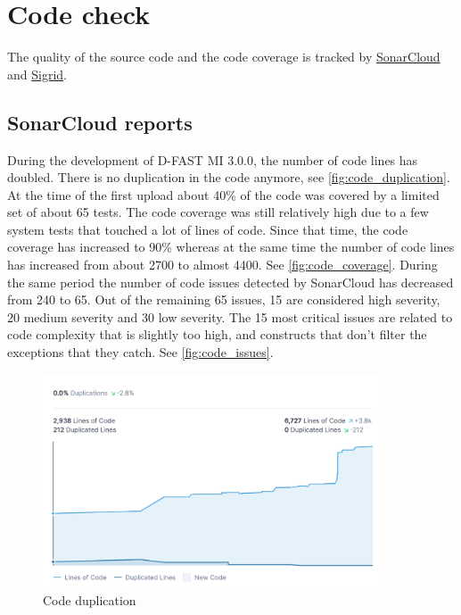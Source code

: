 \section{Code check}
The quality of the \dfastmi source code and the code coverage is tracked by \href{https://sonarcloud.io/project/overview?id=Deltares_D-FAST_Morphological_Impact}{SonarCloud} and \href{https://sigrid-says.com/deltares/dfast-mi/-/overview}{Sigrid}.

\subsection{SonarCloud reports}
During the development of D-FAST MI 3.0.0, the number of code lines has doubled.
There is no duplication in the code anymore, see \autoref{fig:code_duplication}.
At the time of the first upload about 40\% of the code was covered by a limited set of about 65 tests.
The code coverage was still relatively high due to a few system tests that touched a lot of lines of code.
Since that time, the code coverage has increased to 90\% whereas at the same time the number of code lines has increased from about 2700 to almost 4400.
See \autoref{fig:code_coverage}.
During the same period the number of code issues detected by SonarCloud has decreased from 240 to 65.
Out of the remaining 65 issues, 15 are considered high severity, 20 medium severity and 30 low severity.
The 15 most critical issues are related to code complexity that is slightly too high, and  constructs that don't filter the exceptions that they catch.
See \autoref{fig:code_issues}.

\begin{figure}
\center
\includegraphics[width=10cm]{figures/code_duplication.png}
\caption{Code duplication}
\label{fig:code_duplication}
\end{figure}

